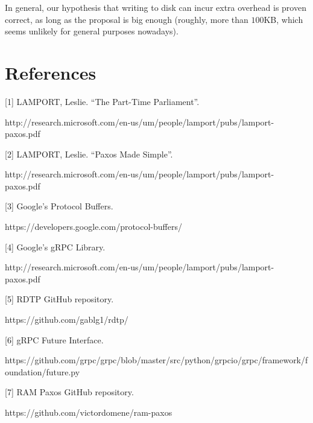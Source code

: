 \documentclass[12pt,]{article}
\begin{document}
In general, our hypothesis that writing to disk can incur extra overhead is proven correct, as long as the proposal is big enough (roughly, more than $100$KB, which seems unlikely for general purposes nowadays).

\section{References}\label{references}

{[}1{]} LAMPORT, Leslie. ``The Part-Time Parliament''.

http://research.microsoft.com/en-us/um/people/lamport/pubs/lamport-paxos.pdf

{[}2{]} LAMPORT, Leslie. ``Paxos Made Simple''.

http://research.microsoft.com/en-us/um/people/lamport/pubs/lamport-paxos.pdf

{[}3{]} Google's Protocol Buffers.

https://developers.google.com/protocol-buffers/

{[}4{]} Google's gRPC Library.

http://research.microsoft.com/en-us/um/people/lamport/pubs/lamport-paxos.pdf

{[}5{]} RDTP GitHub repository.

https://github.com/gablg1/rdtp/

{[}6{]} gRPC Future Interface.

https://github.com/grpc/grpc/blob/master/src/python/grpcio/grpc/framework/foundation/future.py

{[}7{]} RAM Paxos GitHub repository.

https://github.com/victordomene/ram-paxos
\end{document}
